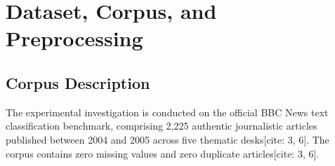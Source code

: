 \documentclass[11pt,a4paper]{article}
\begin{document}
	\section{Dataset, Corpus, and Preprocessing}
	\label{sec:dataset}
	
	\subsection{Corpus Description}
	The experimental investigation is conducted on the official BBC News text classification benchmark, comprising 2,225 authentic journalistic articles published between 2004 and 2005 across five thematic desks[cite: 3, 6]. The corpus contains zero missing values and zero duplicate articles[cite: 3, 6].
	
	\begin{table}[H]
		\centering
		\caption{Dataset distribution across categories and experimental partitions.}
		\label{tab:dataset_split}
	\end{table}
	
\end{document}
